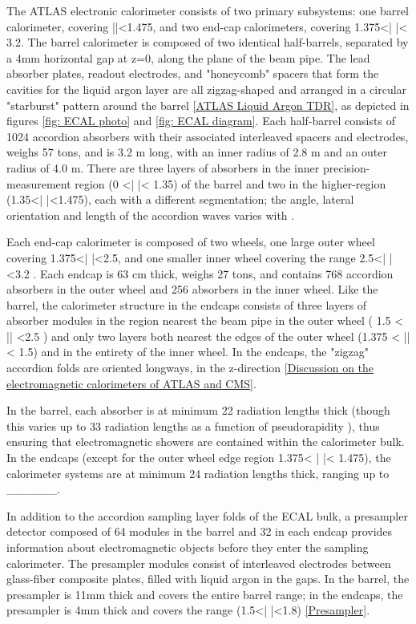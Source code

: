 The ATLAS electronic calorimeter consists of two primary subsystems: one barrel calorimeter, covering |\eta |<1.475, and two end-cap calorimeters, covering 1.375<| \eta |< 3.2. The barrel calorimeter is composed of two identical half-barrels, separated by a 4mm horizontal gap at z=0, along the plane of the beam pipe. The lead absorber plates, readout electrodes, and "honeycomb" spacers that form the cavities for the liquid argon layer are all zigzag-shaped and arranged in a circular "starburst" pattern around the barrel \ref{ATLAS Liquid Argon TDR}, as depicted in figures \ref{fig: ECAL photo} and \ref{fig: ECAL diagram}. Each half-barrel consists of 1024 accordion absorbers with their associated interleaved spacers and electrodes, weighs 57 tons, and is 3.2 m long, with an inner radius of 2.8 m and an outer radius of 4.0 m. There are three layers of absorbers in the inner precision-measurement region (0 <| \eta |< 1.35) of the barrel and two in the higher-\eta region (1.35<| \eta |<1.475), each with a different segmentation; the angle, lateral orientation and length of the accordion waves varies with \eta.

Each end-cap calorimeter is composed of two wheels, one large outer wheel covering 1.375<| \eta |<2.5, and one smaller inner wheel covering the range 2.5<| \eta |<3.2 . Each endcap is 63 cm thick, weighs 27 tons, and contains 768 accordion absorbers in the outer wheel and 256 absorbers in the inner wheel. Like the barrel, the calorimeter structure in the endcaps consists of three layers of absorber modules in the region nearest the beam pipe in the outer wheel ( 1.5 < |\eta | <2.5 ) and only two layers both nearest the edges of the outer wheel (1.375 < |\eta | < 1.5) and in the entirety of the inner wheel. In the endcaps, the "zigzag" accordion folds are oriented longways, in the z-direction \ref{Discussion on the electromagnetic calorimeters of ATLAS and CMS}.

In the barrel, each absorber is at minimum 22 radiation lengths thick (though this varies up to 33 radiation lengths as a function of pseudorapidity \eta), thus ensuring that electromagnetic showers are contained within the calorimeter bulk. In the endcaps (except for the outer wheel edge region  1.375< | \eta |< 1.475), the calorimeter systems are at minimum 24 radiation lengths thick, ranging up to ______.

In addition to the accordion sampling layer folds of the ECAL bulk, a presampler detector composed of 64 modules in the barrel and 32 in each endcap provides information about electromagnetic objects before they enter the sampling calorimeter. The presampler modules consist of interleaved electrodes between glass-fiber composite plates, filled with liquid argon in the gaps. In the barrel, the presampler is 11mm thick and covers the entire barrel range; in the endcaps, the presampler is 4mm thick and covers the range (1.5<| \eta |<1.8) \ref{Presampler}.

